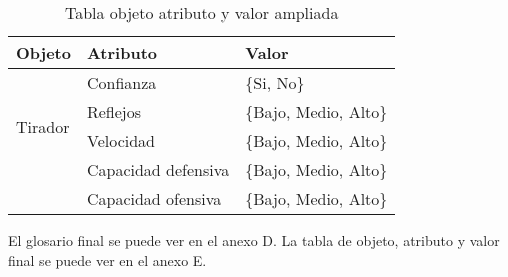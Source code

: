 \begin{table}[]
  \centering
  \caption{Tabla objeto atributo y valor ampliada}
  \label{tab:Tabla objeto atributo y valor ampliada}
  \begin{tabular}{lll}
    Objeto & Atributo & Valor \\ \hline
    \multicolumn{1}{l|}{\multirow{4}{*}{Tirador}} & Confianza & \{Si, No\} \\ \cline{2-3}
    \multicolumn{1}{l|}{} & Reflejos & \{Bajo, Medio, Alto\} \\ \cline{2-3}
    \multicolumn{1}{l|}{} & Velocidad & \{Bajo, Medio, Alto\} \\ \cline{2-3}
    \multicolumn{1}{l|}{} & Capacidad defensiva & \{Bajo, Medio, Alto\} \\ \cline{2-3}
    \multicolumn{1}{l|}{} & Capacidad ofensiva & \{Bajo, Medio, Alto\} \\ \cline{2-3}
  \end{tabular}
\end{table}


El glosario final se puede ver en el anexo D.
La tabla de objeto, atributo y valor final se puede ver en el anexo E.
